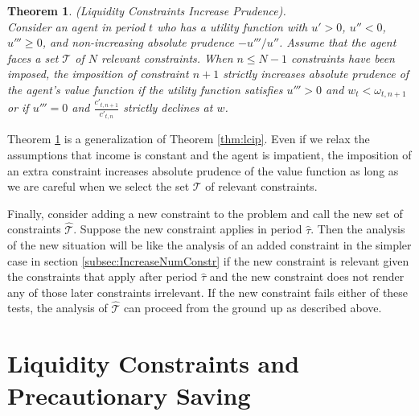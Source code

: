 \documentclass[titlepage]{\econtex}
\providecommand{\wAlt}{\omega}
\newtheorem{theorem}{Theorem}
\begin{document}
\begin{theorem}\label{thm:lcip2} (Liquidity Constraints Increase Prudence). \\
	Consider an agent in period $t$ who has a utility function with $u' > 0$, $u'' < 0$, $u''' \geq 0$, and non-increasing absolute prudence $-u'''/u''$. Assume that the agent faces a set $\mathcal{T}$ of $N$ relevant constraints. When $n \leq N-1$ constraints have been imposed, the imposition of constraint $n+1$ strictly increases absolute prudence of the agent's value function if the utility function satisfies $u''' > 0$ and $w_t < \wAlt_{t,n+1}$ or if $u''' = 0$ and $\frac{c'_{t,n+1}}{c'_{t,n}}$ strictly declines at $w$.
\end{theorem}

Theorem \ref{thm:lcip2} is a generalization of Theorem \ref{thm:lcip}. Even if we relax the assumptions that income is constant and the agent is impatient, the imposition of an extra constraint increases absolute prudence of the value function as long as we are careful when we select the set $\mathcal{T}$ of relevant constraints.

Finally, consider adding a new constraint to the problem and call the new set of constraints $\hat{\mathcal{T}}$.  Suppose the new constraint applies in period $\hat{\tau}$.  Then the analysis of the new situation will be like the analysis of an added constraint in the simpler case in section \ref{subsec:IncreaseNumConstr} if the new constraint is relevant given the constraints that apply after period $\hat{\tau}$ and the new constraint does not render any of those later constraints irrelevant. If the new constraint fails either of these tests, the analysis of $\hat{\mathcal{T}}$ can proceed from the ground up as described above.













\section{Liquidity Constraints and Precautionary Saving}
\label{sec:ConstrRisksCPPandPS}
\end{document}
